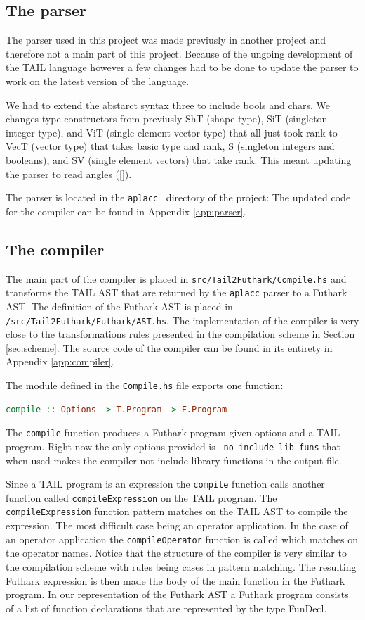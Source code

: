 \documentclass[11pt]{article}
\begin{document}
\subsection{The parser}
The parser used in this project was made previusly in another project \cite{APLACC} and therefore not a main part of this project. Because of the ungoing development of the TAIL language however a few changes had to be done to update the parser to work on the latest version of the language. 

We had to extend the abstarct syntax three to include bools and chars. 
We changes type constructors from previusly ShT (shape type), SiT (singleton integer type), and ViT (single element vector type) that all just took rank
to VecT (vector type) that takes basic type and rank, S (singleton integers and booleans), and SV (single element vectors) that take rank. 
This meant updating the parser to read angles ([]).

The parser is located in the {\tt aplacc } directory of the project: 
The updated code for the compiler can be found in Appendix \ref{app:parser}.

\subsection{The compiler}
The main part of the compiler is placed in {\tt src/Tail2Futhark/Compile.hs} and transforms the TAIL AST that are returned by the {\tt aplacc} parser to a Futhark AST. The definition of the Futhark AST is placed in {\tt /src/Tail2Futhark/Futhark/AST.hs}.
The implementation of the compiler is very close to the transformations rules presented in the compilation scheme in Section \ref{sec:scheme}. The source code of the compiler can be found in its entirety in Appendix \ref{app:compiler}.

The module defined in the {\tt Compile.hs} file exports one function:
\begin{lstlisting}[language=haskell]
compile :: Options -> T.Program -> F.Program
\end{lstlisting}

The {\tt compile} function produces a Futhark program given options and a TAIL program. 
Right now the only options provided is {\tt --no-include-lib-funs} that when used makes the compiler not include library functions in the output file. 

Since a TAIL program is an expression the {\tt compile} function calls another function called {\tt compileExpression} on the TAIL program. The {\tt compileExpression} function pattern matches on the TAIL AST to compile the expression. The most difficult case being an operator application. In the case of an operator application the {\tt compileOperator} function is called which matches on the operator names. Notice that the structure of the compiler is very similar to the compilation scheme with rules being cases in pattern matching.
The resulting Futhark expression is then made the body of the main
function in the Futhark program. 
In our representation of the Futhark AST a Futhark program consists of a list of function declarations that are represented by the type FunDecl. 
\end{document}
